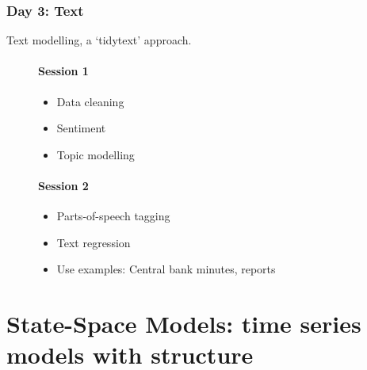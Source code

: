 \documentclass[
  letterpaper,
]{book}
\providecommand{\tightlist}{%
  \setlength{\itemsep}{0pt}\setlength{\parskip}{0pt}}\usepackage{longtable,booktabs,array}
\begin{document}
\hypertarget{day-3-text}{%
\subsection{Day 3: Text}\label{day-3-text}}

Text modelling, a `tidytext' approach.

\begin{figure}

\begin{minipage}[t]{0.50\linewidth}

{\centering 

\hypertarget{session-1}{%
\subsubsection{Session 1}\label{session-1}}

\begin{itemize}
\tightlist
\item
  Data cleaning
\item
  Sentiment
\item
  Topic modelling
\end{itemize}

}

\end{minipage}%
%
\begin{minipage}[t]{0.50\linewidth}

{\centering 

\hypertarget{session-2}{%
\subsubsection{Session 2}\label{session-2}}

\begin{itemize}
\tightlist
\item
  Parts-of-speech tagging
\item
  Text regression
\item
  Use examples: Central bank minutes, reports
\end{itemize}

}

\end{minipage}%

\end{figure}

\hypertarget{state-space-models-time-series-models-with-structure}{%
\chapter{State-Space Models: time series models with
structure}\label{state-space-models-time-series-models-with-structure}}
\end{document}
